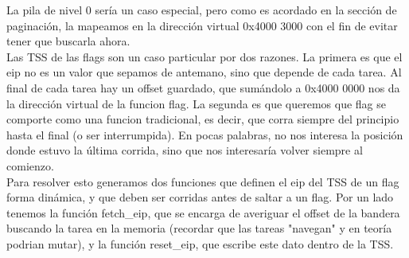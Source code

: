 La pila de nivel 0 ser\'ia un caso especial, pero como es acordado en la secci\'on de paginaci\'on, la mapeamos en la direcci\'on virtual
 0x4000 3000 con el fin de evitar tener que buscarla ahora.
\\
Las TSS de las flags son un caso particular por dos razones. La primera es que el eip no es un valor que sepamos de antemano, sino que 
depende de cada tarea. Al final de cada tarea hay un offset guardado, que sum\'andolo a 0x4000 0000 nos da la direcci\'on virtual 
de la funcion flag. La segunda es que queremos que flag se comporte como una funcion tradicional, es decir, que corra siempre del 
principio hasta el final (o ser interrumpida). En pocas palabras, no nos interesa la posici\'on donde estuvo la \'ultima corrida, sino
que nos interesar\'ia volver siempre al comienzo.\\
Para resolver esto generamos dos funciones que definen el eip del TSS de un flag forma din\'amica, y que deben ser corridas antes de 
saltar a un flag. Por un lado tenemos la funci\'on fetch\_eip, que se encarga de averiguar el offset de la bandera buscando la tarea 
en la memoria (recordar que las tareas "navegan" y en teor\'ia podrian mutar), y la funci\'on reset\_eip, que escribe este dato dentro 
de la TSS.\\
